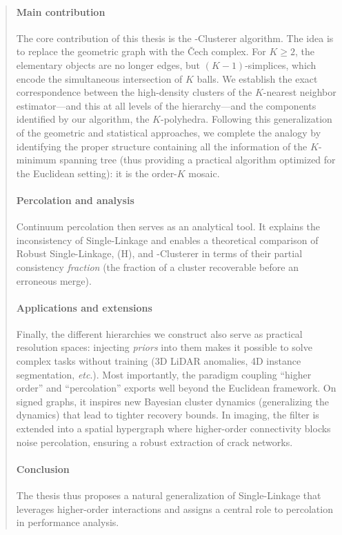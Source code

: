 \begin{AbstractPage}
\begin{abstract}
\paragraph{Main contribution}
The core contribution of this thesis is the \HGP-Clusterer algorithm. The idea is to replace the geometric graph with the \v{C}ech complex. For \(K\geq2\), the elementary objects are no longer edges, but \((K-1)\)-simplices, which encode the simultaneous intersection of \(K\) balls. 
We establish the exact correspondence between the high-density clusters of the $K$-nearest neighbor estimator---and this at all levels of the hierarchy---and the components identified by our algorithm, the \(K\)-polyhedra. 
Following this generalization of the geometric and statistical approaches, we complete the analogy by identifying the proper structure containing all the information of the $K$-minimum spanning tree (thus providing a practical algorithm optimized for the Euclidean setting): it is the order-$K$  mosaic.

\paragraph{Percolation and analysis}
Continuum percolation then serves as an analytical tool. It explains the inconsistency of Single-Linkage and enables a theoretical comparison of Robust Single-Linkage, (H)\DBSCAN, and \HGP-Clusterer in terms of their partial consistency \emph{fraction} (the fraction of a cluster recoverable before an erroneous merge). 

\paragraph{Applications and extensions}
Finally, the different hierarchies we construct also serve as practical resolution spaces: injecting \emph{priors} into them makes it possible to solve complex tasks without training (3D LiDAR anomalies, 4D instance segmentation, \emph{etc}.). Most importantly, the paradigm coupling ``higher order'' and ``percolation'' exports well beyond the Euclidean framework. On signed graphs, it inspires new Bayesian cluster dynamics (generalizing the  dynamics) that lead to tighter recovery bounds. In imaging, the  filter is extended into a spatial hypergraph where higher-order connectivity blocks noise percolation, ensuring a robust extraction of crack networks.

\paragraph{Conclusion}
The thesis thus proposes a natural generalization of Single-Linkage that leverages higher-order interactions and assigns a central role to percolation in performance analysis. %
\end{abstract}


\end{AbstractPage}
